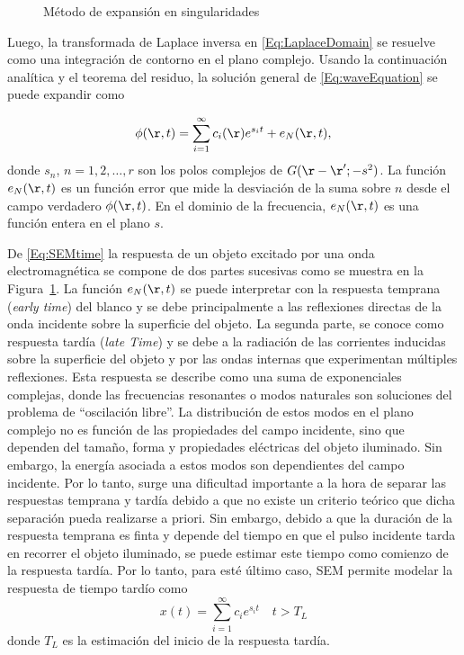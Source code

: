 \begin{figure}[t]
	\centering
	\resizebox{\linewidth}{!}{}
	\caption{Método de expansión en singularidades}
	\label{Fig:SEM}	
\end{figure}


Luego, la transformada de Laplace inversa en \eqref{Eq:LaplaceDomain}  se resuelve como una integración de contorno en el plano complejo. Usando la continuación analítica y el teorema del residuo, la solución general de \eqref{Eq:waveEquation} se puede expandir como

\begin{equation}
	\phi(\r,t) = \sum_{i=1}^{\infty}c_i(\r)e^{s_it} + e_N(\r,t),
	\label{Eq:SEMtime}
\end{equation}
donde $s_n$, $n=1,2,\ldots,r$ son los polos complejos de $G(\r-\r';-s^2)$. La función $e_N(\r,t)$ es un función error que mide la desviación de la suma sobre $n$ desde el campo verdadero $\phi(\r,t)$. En el dominio de la frecuencia, $e_N(\r,t)$ es una función entera en el plano $s$.

De \eqref{Eq:SEMtime} la respuesta de un objeto excitado por una onda electromagnética se compone de dos partes sucesivas como se muestra en la Figura~\ref{Fig:SEM}. La función $e_N(\r,t)$ se puede interpretar con la respuesta temprana (\emph{early time}) del blanco y se debe principalmente a las reflexiones directas de la onda incidente sobre la superficie del objeto. La segunda parte, se conoce como respuesta tardía (\emph{late Time}) y se debe a la radiación de las corrientes inducidas sobre la superficie del objeto y  por las ondas internas que experimentan múltiples reflexiones. Esta respuesta se describe como una suma de exponenciales complejas, donde las frecuencias resonantes o modos naturales son soluciones del problema de ``oscilación libre''. La distribución de estos modos en el plano complejo no es función de las propiedades del campo incidente, sino que dependen del tamaño, forma y propiedades eléctricas del objeto iluminado. Sin embargo, la energía asociada a estos modos son dependientes del campo incidente. Por lo tanto, surge una dificultad importante a la hora de separar las respuestas temprana y tardía debido a que no existe un criterio teórico que dicha separación pueda realizarse a priori. Sin embargo, debido a que la duración de la respuesta temprana es finta y depende del tiempo en que el pulso incidente tarda en recorrer el objeto iluminado, se puede estimar este tiempo como comienzo de la respuesta tardía. Por lo tanto, para esté último caso, SEM permite modelar la respuesta de tiempo tardío como
\begin{equation}
	x(t) = \sum_{i=1}^{\infty}c_ie^{s_it} \quad t> T_L
	\label{Eq:SEM_LateTime}
\end{equation}
donde $T_L$ es la estimación del inicio de la respuesta tardía. 

